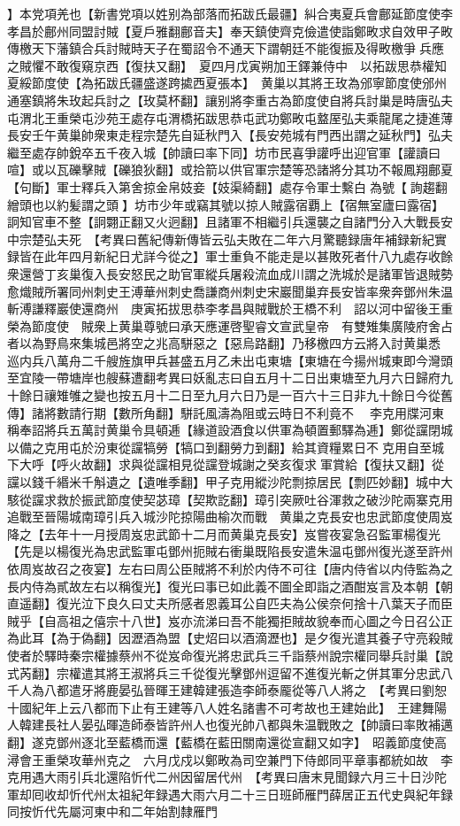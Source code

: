 】本党項羌也【新書党項以姓别為部落而拓跋氏最疆】糾合夷夏兵會鄜延節度使李孝昌於鄜州同盟討賊【夏戶雅翻鄜音夫】奉天鎮使齊克儉遣使詣鄭畋求自效甲子畋傳檄天下藩鎮合兵討賊時天子在蜀詔令不通天下謂朝廷不能復振及得畋檄爭兵應之賊懼不敢復窺京西【復扶又翻】　夏四月戊寅朔加王鐸兼侍中　以拓跋思恭權知夏綏節度使【為拓跋氏疆盛遂跨㨿西夏張本】　黄巢以其將王玫為邠寧節度使邠州通塞鎮將朱玫起兵討之【玫莫杯翻】讓别將李重古為節度使自將兵討巢是時唐弘夫屯渭北王重榮屯沙苑王處存屯渭橋拓跋思恭屯武功鄭畋屯盩厔弘夫乘龍尾之捷進薄長安壬午黄巢帥衆東走程宗楚先自延秋門入【長安苑城有門西出謂之延秋門】弘夫繼至處存帥銳卒五千夜入城【帥讀曰率下同】坊市民喜爭讙呼出迎官軍【讙讀曰喧】或以瓦礫擊賊【礫狼狄翻】或拾箭以供官軍宗楚等恐諸將分其功不報鳳翔鄜夏【句斷】軍士釋兵入第舍掠金帛妓妾【妓渠綺翻】處存令軍士繫白為號【詢趨翻繒頭也以約髪謂之頭】坊市少年或竊其號以掠人賊露宿覇上【宿無室廬曰露宿】詗知官車不整【詗翾正翻又火迥翻】且諸軍不相繼引兵還襲之自諸門分入大戰長安中宗楚弘夫死　【考異曰舊紀傳新傳皆云弘夫敗在二年六月驚聽録唐年補録新紀實録皆在此年四月新紀日尤詳今從之】軍士重負不能走是以甚敗死者什八九處存收餘衆還營丁亥巢復入長安怒民之助官軍縱兵屠殺流血成川謂之洗城於是諸軍皆退賊勢愈熾賊所署同州刺史王溥華州刺史喬謙商州刺史宋巖聞巢弃長安皆率衆奔鄧州朱温斬溥謙釋巖使還商州　庚寅拓拔思恭李孝昌與賊戰於王橋不利　詔以河中留後王重榮為節度使　賊衆上黄巢尊號曰承天應運啓聖睿文宣武皇帝　有雙雉集廣陵府舍占者以為野鳥來集城邑將空之兆高駢惡之【惡烏路翻】乃移檄四方云將入討黄巢悉巡内兵八萬舟二千艘旌旗甲兵甚盛五月乙未出屯東塘【東塘在今揚州城東即今灣頭至宜陵一帶塘岸也艘蘇遭翻考異曰妖亂志曰自五月十二日出東塘至九月六日歸府九十餘日禳雉雊之變也按五月十二日至九月六日乃是一百六十三日非九十餘日今從舊傳】諸將數請行期【數所角翻】駢託風濤為阻或云時日不利竟不　李克用牒河東稱奉詔將兵五萬討黄巢令具頓逓【緣道設酒食以供軍為頓置郵驛為逓】鄭從讜閉城以備之克用屯於汾東從讜犒勞【犒口到翻勞力到翻】給其資糧累日不克用自至城下大呼【呼火故翻】求與從讜相見從讜登城謝之癸亥復求軍賞給【復扶又翻】從讜以錢千緡米千斛遺之【遺唯季翻】甲子克用縱沙陀剽掠居民【剽匹妙翻】城中大駭從讜求救於振武節度使契苾璋【契欺訖翻】璋引突厥吐谷渾救之破沙陀兩寨克用追戰至晉陽城南璋引兵入城沙陀掠陽曲榆次而戰　黄巢之克長安也忠武節度使周岌降之【去年十一月授周岌忠武節十二月而黄巢克長安】岌嘗夜宴急召監軍楊復光【先是以楊復光為忠武監軍屯鄧州扼賊右衝巢既陷長安遣朱温屯鄧州復光遂至許州依周岌故召之夜宴】左右曰周公臣賊將不利於内侍不可往【唐内侍省以内侍監為之長内侍為貳故左右以稱復光】復光曰事已如此義不圖全即詣之酒酣岌言及本朝【朝直遥翻】復光泣下良久曰丈夫所感者恩義耳公自匹夫為公侯奈何捨十八葉天子而臣賊乎【自高祖之僖宗十八世】岌亦流涕曰吾不能獨拒賊故貌奉而心圖之今日召公正為此耳【為于偽翻】因瀝酒為盟【史炤曰以酒滴瀝也】是夕復光遣其養子守亮殺賊使者於驛時秦宗權據蔡州不從岌命復光將忠武兵三千詣蔡州說宗權同舉兵討巢【說式芮翻】宗權遣其將王淑將兵三千從復光擊鄧州逗留不進復光斬之併其軍分忠武八千人為八都遣牙將鹿晏弘晉暉王建韓建張造李師泰龎從等八人將之　【考異曰劉恕十國紀年上云八都而下止有王建等八人姓名諸書不可考故也王建始此】　王建舞陽人韓建長社人晏弘暉造師泰皆許州人也復光帥八都與朱温戰敗之【帥讀曰率敗補邁翻】遂克鄧州逐北至藍橋而還【藍橋在藍田關南還從宣翻又如字】　昭義節度使高潯會王重榮攻華州克之　六月戊戍以鄭畋為司空兼門下侍郎同平章事都統如故　李克用遇大雨引兵北還陷忻代二州因留居代州　【考異曰唐末見聞録六月三十日沙陀軍却囘收却忻代州太祖紀年録遇大雨六月二十三日班師雁門薛居正五代史與紀年録同按忻代先屬河東中和二年始割隸雁門